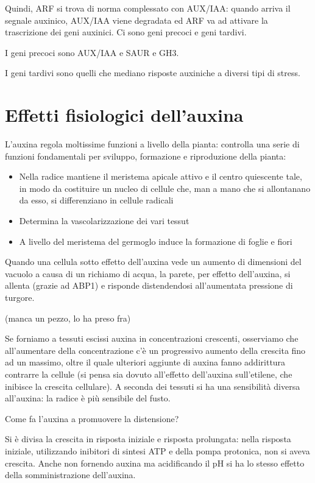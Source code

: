 \documentclass[a4paper,12pt]{book}
\begin{document}
Quindi, ARF si trova di norma complessato con AUX/IAA: quando arriva il segnale auxinico, AUX/IAA viene degradata ed ARF va ad attivare la trascrizione dei geni auxinici. Ci sono geni precoci e geni tardivi. 

I geni precoci sono AUX/IAA e SAUR e GH3.

I geni tardivi sono quelli che mediano risposte auxiniche a diversi tipi di stress.

\section{Effetti fisiologici dell'auxina}
L'auxina regola moltissime funzioni a livello della pianta: controlla una serie di funzioni fondamentali per sviluppo, formazione e riproduzione della pianta:
\begin{itemize}

\item{Nella radice mantiene il meristema apicale attivo e il centro quiescente tale, in modo da costituire un nucleo di cellule che, man a mano che si allontanano da esso, si differenziano in cellule radicali}
\item{Determina la vascolarizzazione dei vari tessut}
\item{A livello del meristema del germoglo induce la formazione di foglie e fiori}
\end{itemize}
Quando una cellula sotto effetto dell'auxina vede un aumento di dimensioni del vacuolo a causa di un richiamo di acqua, la parete, per effetto dell'auxina, si allenta (grazie ad ABP1) e risponde distendendosi all'aumentata pressione di turgore.

(manca un pezzo, lo ha preso fra)

Se forniamo a tessuti escissi auxina in concentrazioni crescenti, osserviamo che all'aumentare della concentrazione c'è un progressivo aumento della crescita fino ad un massimo, oltre il quale ulteriori aggiunte di auxina fanno addirittura contrarre la cellule (si pensa sia dovuto all'effetto dell'auxina sull'etilene, che inibisce la crescita cellulare). A seconda dei tessuti si ha una sensibilità diversa all'auxina: la radice è più sensibile del fusto.

Come fa l'auxina a promuovere la distensione?

Si è divisa la crescita in risposta iniziale e risposta prolungata: nella risposta iniziale, utilizzando inibitori di sintesi ATP e della pompa protonica, non si aveva crescita. Anche non fornendo auxina ma acidificando il pH si ha lo stesso effetto della somministrazione dell'auxina.
\end{document}
